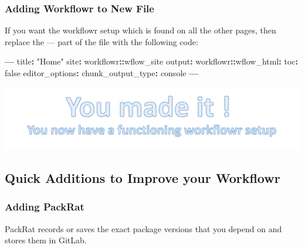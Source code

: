\documentclass[openany]{book}
\newenvironment{Shaded}{\begin{snugshade}}{\end{snugshade}}
\newcommand{\NormalTok}[1]{#1}
\newcommand{\OperatorTok}[1]{\textcolor[rgb]{0.81,0.36,0.00}{\textbf{#1}}}
\newcommand{\StringTok}[1]{\textcolor[rgb]{0.31,0.60,0.02}{#1}}
\begin{document}
\hypertarget{adding-workflowr-to-new-file}{%
\subsubsection{Adding Workflowr to New File}\label{adding-workflowr-to-new-file}}

If you want the workflowr setup which is found on all the other pages, then replace the --- part of the file with the following code:

\begin{Shaded}
\begin{Highlighting}[]
            \OperatorTok{---}
\StringTok{            }\NormalTok{title}\OperatorTok{:}\StringTok{ "Home"}
\NormalTok{            site}\OperatorTok{:}\StringTok{ }\NormalTok{workflowr}\OperatorTok{::}\NormalTok{wflow_site}
\NormalTok{            output}\OperatorTok{:}
\StringTok{              }\NormalTok{workflowr}\OperatorTok{::}\NormalTok{wflow_html}\OperatorTok{:}
\StringTok{                }\NormalTok{toc}\OperatorTok{:}\StringTok{ }\NormalTok{false}
\NormalTok{            editor_options}\OperatorTok{:}
\StringTok{              }\NormalTok{chunk_output_type}\OperatorTok{:}\StringTok{ }\NormalTok{console}
            \OperatorTok{---}
\end{Highlighting}
\end{Shaded}

\begin{center}\includegraphics[width=0.6\linewidth]{images/Workflow_Photos/uMadeIt2} \end{center}

\hypertarget{quick-additions-to-improve-your-workflowr}{%
\subsection{Quick Additions to Improve your Workflowr}\label{quick-additions-to-improve-your-workflowr}}

\hypertarget{adding-packrat-1}{%
\subsubsection{Adding PackRat}\label{adding-packrat-1}}

PackRat records or saves the exact package versions that you depend on and stores them in GitLab.
\end{document}
